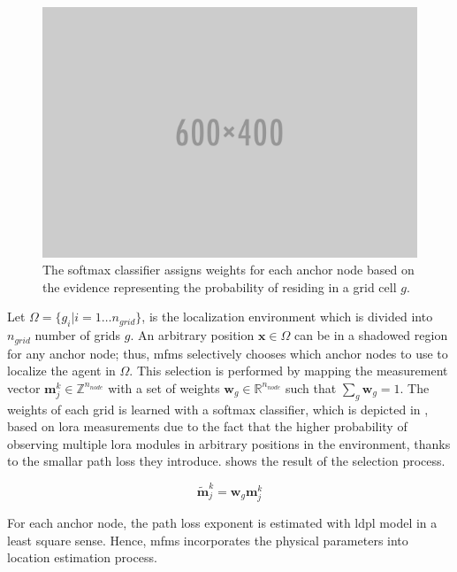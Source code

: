     \begin{figure}[thpb]
       \centering
       \includegraphics[width=\linewidth]{figures/placeholder.png}
       \caption{\label{fig:softmax}The softmax classifier assigns weights for each anchor node based on the evidence representing the probability of residing in a grid cell $g$.}
    \end{figure}

    Let $\Omega=\{g_i | i=1\ldots n_{grid}\}$, is the localization environment which is divided into $n_{grid}$ number of grids $g$.
    An arbitrary position $\bm{x} \in \Omega$ can be in a shadowed region for any anchor node; thus, \gls{mfms} selectively chooses which anchor nodes to use to localize the agent in $\Omega$.
    This selection is performed by mapping the measurement vector $\bm{m}^{k}_j \in \mathbb{Z}^{n_{node}}$ with a set of weights $\bm{w}_g \in \mathbb{R}^{n_{node}}$ such that $\sum_g \bm{w}_g = 1$.
    The weights of each grid is learned with a softmax classifier, which is depicted in , based on \gls{lora} measurements due to the fact that the higher probability of observing multiple \gls{lora} modules in arbitrary positions in the environment, thanks to the smallar path loss they introduce.
     shows the result of the selection process.

    \begin{equation}
        \label{eq:weighted_m}
        \bm{\widetilde{m}}^{k}_j = \bm{w}_g \bm{m}^{k}_j
    \end{equation}

    For each anchor node, the path loss exponent is estimated with \gls{ldpl} model in a least square sense.
    Hence, \gls{mfms} incorporates the physical parameters into location estimation process.

